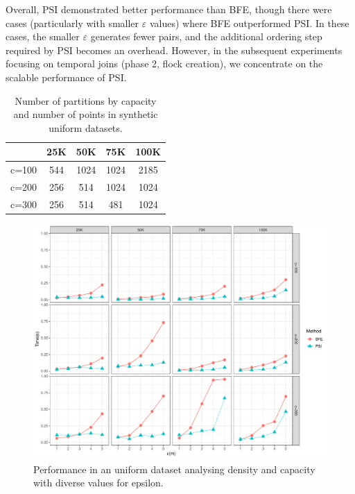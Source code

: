 Overall, PSI demonstrated better performance than BFE, though there were cases (particularly with smaller $\varepsilon$ values) where BFE outperformed PSI. In 
these cases, the smaller $\varepsilon$ generates fewer pairs, and the additional ordering step required by PSI becomes an overhead. However, in the subsequent 
experiments focusing on temporal joins (phase 2, flock creation), we concentrate on the scalable performance of PSI.

\begin{table}
    \centering
    \caption{Number of partitions by capacity and number of points in synthetic uniform datasets.}
    \label{tab:uniform_ncells}
    \begin{tabular}{c|cccc}
              & 25K & 50K  & 75K  & 100K \\
        \hline
        c=100 & 544 & 1024 & 1024 & 2185 \\
        c=200 & 256 & 514  & 1024 & 1024 \\
        c=300 & 256 & 514  & 481  & 1024 \\
    \end{tabular}
\end{table}

\begin{figure}
    \centering
    \includegraphics[width=\linewidth]{figures/plots/05_uniform_performance/uniform_performance.pdf}
    \caption{Performance in an uniform dataset analysing density and capacity with diverse values for epsilon.}\label{fig:uniform_performance}
\end{figure}

